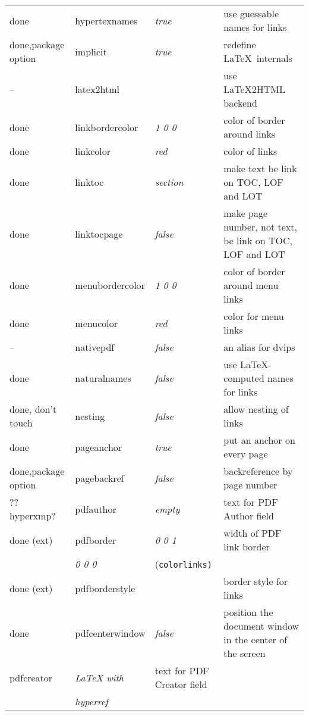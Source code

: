 \begin{longtable}{@{}l>{\ttfamily}llp{7cm}@{}}
done & hypertexnames      & \textit{true}          & use guessable names for links \\
done,package option & implicit           & \textit{true}          & redefine \LaTeX\ internals \\
-- & latex2html         &                        & use \textsf{\LaTeX2HTML} backend \\
done & linkbordercolor    & \textit{1 0 0}         & color of border around links \\
done & linkcolor          & \textit{red}           & color of links \\
done &linktoc            & \textit{section}       & make text be link on TOC, LOF and LOT \\
done & linktocpage        & \textit{false}         & make page number, not text, be link on TOC, LOF and LOT \\
done & menubordercolor    & \textit{1 0 0}         & color of border around menu links \\
done & menucolor          & \textit{red}           & color for menu links \\
-- & nativepdf          & \textit{false}         & an alias for \textsf{dvips} \\
done & naturalnames       & \textit{false}         & use \LaTeX-computed names for links \\
done, don't touch & nesting            & \textit{false}         & allow nesting of links \\
done & pageanchor         & \textit{true}          & put an anchor on every page \\
done,package option & pagebackref        & \textit{false}         & backreference by page number \\
?? hyperxmp? & pdfauthor          & \textit{empty}         & text for PDF Author field \\
done (ext) & pdfborder          & \textit{0 0 1}         & width of PDF link border \\
                   & \textit{0 0 0}         & (\texttt{colorlinks)} \\
done (ext) & pdfborderstyle     &                        & border style for links \\
done & pdfcenterwindow    & \textit{false}         & position the document window in the center of the screen \\
pdfcreator         & \textit{LaTeX with}    & text for PDF Creator field \\
                   & \textit{hyperref}      & \\

\end{longtable}
